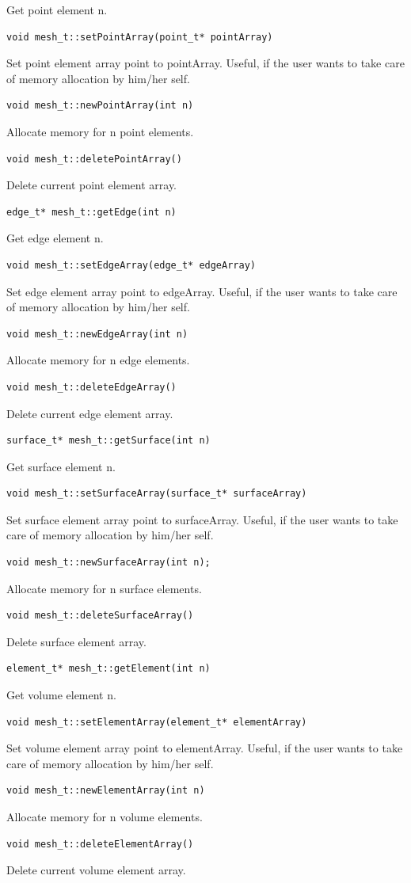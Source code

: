 Get point element n.
\begin{verbatim}
void mesh_t::setPointArray(point_t* pointArray)
\end{verbatim}
Set point element array point to pointArray. Useful, if the user wants to take care of memory allocation by him/her self.
\begin{verbatim} 
void mesh_t::newPointArray(int n)
\end{verbatim}
Allocate memory for n point elements.
\begin{verbatim}
void mesh_t::deletePointArray()
\end{verbatim}
Delete current point element array.
\begin{verbatim}
edge_t* mesh_t::getEdge(int n)
\end{verbatim}
Get edge element n.
\begin{verbatim}
void mesh_t::setEdgeArray(edge_t* edgeArray)
\end{verbatim}
Set edge element array point to edgeArray. Useful, if the user wants to take care of memory allocation by him/her self.
\begin{verbatim} 
void mesh_t::newEdgeArray(int n)
\end{verbatim}
Allocate memory for n edge elements.
\begin{verbatim}
void mesh_t::deleteEdgeArray()
\end{verbatim}
Delete current edge element array.
\begin{verbatim}
surface_t* mesh_t::getSurface(int n)
\end{verbatim}
Get surface element n.
\begin{verbatim}
void mesh_t::setSurfaceArray(surface_t* surfaceArray)
\end{verbatim}
Set surface element array point to surfaceArray. Useful, if the user wants to take care of memory allocation by him/her self.
\begin{verbatim} 
void mesh_t::newSurfaceArray(int n);
\end{verbatim}
Allocate memory for n surface elements.
\begin{verbatim}
void mesh_t::deleteSurfaceArray()
\end{verbatim}
Delete surface element array.
\begin{verbatim}
element_t* mesh_t::getElement(int n)
\end{verbatim}
Get volume element n.
\begin{verbatim}
void mesh_t::setElementArray(element_t* elementArray)
\end{verbatim}
Set volume element array point to elementArray. Useful, if the user wants to take care of memory allocation by him/her self.
\begin{verbatim} 
void mesh_t::newElementArray(int n)
\end{verbatim}
Allocate memory for n volume elements.
\begin{verbatim} 
void mesh_t::deleteElementArray()
\end{verbatim}
Delete current volume element array.

